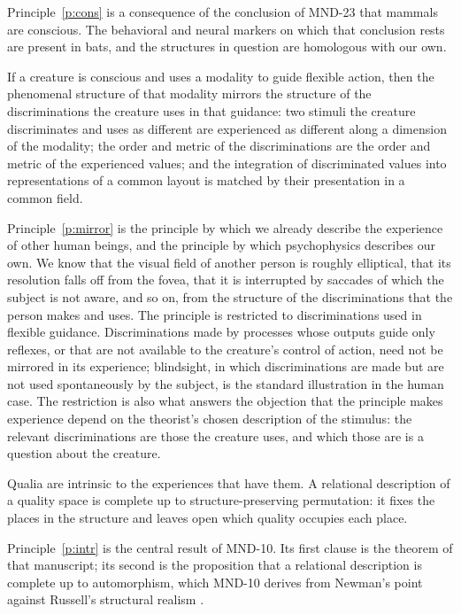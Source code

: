 \documentclass{situationist-preprint}
\begin{document}
Principle~\ref{p:cons} is a consequence of the conclusion of MND-23 that mammals are conscious. The behavioral and neural markers on which that conclusion rests are present in bats, and the structures in question are homologous with our own.

\begin{principle}[Mirroring]\label{p:mirror}
If a creature is conscious and uses a modality to guide flexible action, then the phenomenal structure of that modality mirrors the structure of the discriminations the creature uses in that guidance: two stimuli the creature discriminates and uses as different are experienced as different along a dimension of the modality; the order and metric of the discriminations are the order and metric of the experienced values; and the integration of discriminated values into representations of a common layout is matched by their presentation in a common field.
\end{principle}

Principle~\ref{p:mirror} is the principle by which we already describe the experience of other human beings, and the principle by which psychophysics describes our own. We know that the visual field of another person is roughly elliptical, that its resolution falls off from the fovea, that it is interrupted by saccades of which the subject is not aware, and so on, from the structure of the discriminations that the person makes and uses. The principle is restricted to discriminations used in flexible guidance. Discriminations made by processes whose outputs guide only reflexes, or that are not available to the creature's control of action, need not be mirrored in its experience; blindsight, in which discriminations are made but are not used spontaneously by the subject, is the standard illustration in the human case. The restriction is also what answers the objection that the principle makes experience depend on the theorist's chosen description of the stimulus: the relevant discriminations are those the creature uses, and which those are is a question about the creature.

\begin{principle}[Intrinsicness]\label{p:intr}
Qualia are intrinsic to the experiences that have them. A relational description of a quality space is complete up to structure-preserving permutation: it fixes the places in the structure and leaves open which quality occupies each place.
\end{principle}

Principle~\ref{p:intr} is the central result of MND-10. Its first clause is the theorem of that manuscript; its second is the proposition that a relational description is complete up to automorphism, which MND-10 derives from Newman's point against Russell's structural realism \citep{Newman1928}.
\end{document}

